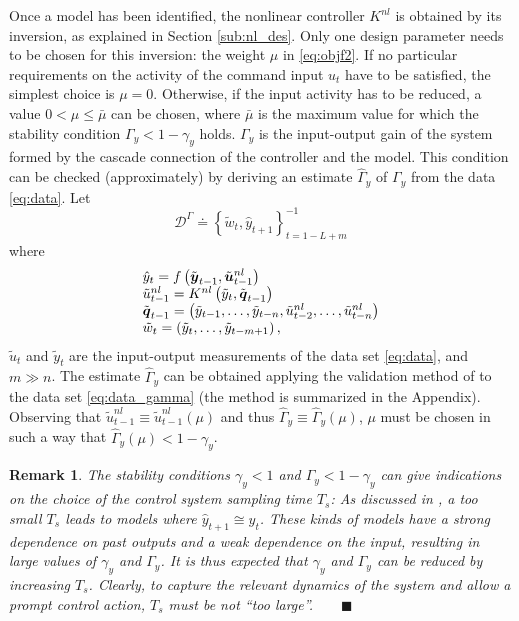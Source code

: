 \documentclass[twocolumn,english,journal]{IEEEtran}
\newtheorem{remark}{Remark}
\begin{document}
Once a model has been identified, the nonlinear controller $K^{nl}$
is obtained by its inversion, as explained in Section \ref{sub:nl_des}.
Only one design parameter needs to be chosen for this inversion: the
weight $\mu$ in \eqref{eq:objf2}. If no particular requirements
on the activity of the command input $u_{t}$ have to be satisfied,
the simplest choice is $\mu=0$. Otherwise, if the input activity
has to be reduced, a value $0<\mu\leq\bar{\mu}$ can be chosen, where
$\bar{\mu}$ is the maximum value for which the stability condition
$\Gamma_{y}<1-\gamma_{y}$ holds. $\Gamma_{y}$ is the input-output
gain of the system formed by the cascade connection of the controller
and the model. This condition can be checked (approximately) by deriving
an estimate $\hat{\Gamma}_{y}$ of $\Gamma_{y}$ from the data \eqref{eq:data}.
Let
\begin{equation}
\mathcal{D}^{\Gamma}\doteq\left\{ \tilde{w}_{t},\hat{y}_{t+1}\right\} _{t=1-L+m}^{-1}\label{eq:data_gamma}
\end{equation}
where 
\begin{equation}
\begin{array}[t]{l}
\hat{y}_{t}=f\left(\tilde{\boldsymbol{y}}_{t-1},\tilde{\boldsymbol{u}}_{t-1}^{nl}\right)\\
\tilde{u}_{t-1}^{nl}=K^{nl}\left(\tilde{y}_{t},\tilde{\boldsymbol{q}}_{t-1}\right)\\
\tilde{\boldsymbol{q}}_{t-1}=\left(\tilde{y}_{t-1},\ldots,\tilde{y}_{t-n},\tilde{u}_{t-2}^{nl},\ldots,\tilde{u}_{t-n}^{nl}\right)\\
\tilde{w}_{t}=\left(\tilde{y}_{t},\ldots,\tilde{y}_{t-m+1}\right),
\end{array}\label{eq:stiga}
\end{equation}
$\tilde{u}_{t}$ and $\tilde{y}_{t}$ are the input-output measurements
of the data set \eqref{eq:data}, and $m\gg n$. The estimate $\hat{\Gamma}_{y}$
can be obtained applying the validation method of \cite{MiNoAUT04}
to the data set \eqref{eq:data_gamma} (the method is summarized in
the Appendix). Observing that $\tilde{u}_{t-1}^{nl}\equiv\tilde{u}_{t-1}^{nl}\left(\mu\right)$
and thus $\hat{\Gamma}_{y}\equiv\hat{\Gamma}_{y}\left(\mu\right)$,
$\mu$ must be chosen in such a way that $\hat{\Gamma}_{y}\left(\mu\right)<1-\gamma_{y}$.\medskip{}


\begin{remark}The stability conditions $\gamma_{y}<1$ and $\Gamma_{y}<1-\gamma_{y}$
can give indications on the choice of the control system sampling
time $T_{s}$: As discussed in \cite{Goodwin2010}, a too small $T_{s}$
leads to models where $\hat{y}_{t+1}\cong y_{t}$. These kinds of
models have a strong dependence on past outputs and a weak dependence
on the input, resulting in large values of $\gamma_{y}$ and $\Gamma_{y}$.
It is thus expected that $\gamma_{y}$ and $\Gamma_{y}$ can be reduced
by increasing $T_{s}$. Clearly, to capture the relevant dynamics
of the system and allow a prompt control action, $T_{s}$ must be
not ``too large''.$\qquad\blacksquare$\end{remark}
\end{document}
